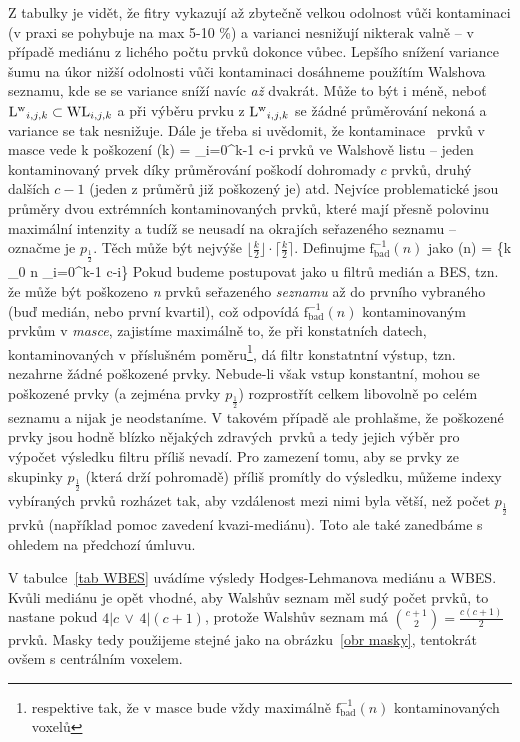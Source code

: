     Z tabulky je vidět, že fitry vykazují až zbytečně velkou odolnost vůči kontaminaci (v praxi se pohybuje na max 5-10 \%) a varianci nesnižují nikterak valně -- v případě mediánu z lichého počtu prvků dokonce vůbec. Lepšího snížení variance šumu na úkor nižší odolnosti vůči kontaminaci dosáhneme použítím Walshova seznamu, kde se se variance sníží navíc \emph{až} dvakrát. Může to být i méně, neboť ${\mathrm{L^w}_{i,j,k}} \subset {\mathrm{WL}_{i,j,k}}$ a při výběru prvku z ${\mathrm{L^w}_{i,j,k}}$ se žádné průměrování nekoná a variance se tak nesnižuje. Dále je třeba si uvědomit, že kontaminace \kk~prvků v masce vede k poškození 
    \beq
    (k) = \sum_{i=0}^{k-1} c-i 
    \eeq
    prvků ve Walshově listu -- jeden kontaminovaný prvek díky průměrování poškodí dohromady $c$ prvků, druhý dalších $c-1$ (jeden z průměrů již poškozený je) atd. Nejvíce problematické jsou průměry dvou extrémních kontaminovaných prvků, které mají přesně polovinu maximální intenzity a tudíž se neusadí na okrajích seřazeného seznamu -- označme je $p_{\frac{1}{2}}$. Těch může být nejvýše $\lfloor\frac{k}{2}\rfloor\cdot\lceil\frac{k}{2}\rceil$. Definujme $\mathrm{f_{bad}^{-1}}(n)$ jako
    \beq
    (n) = \max\bigg\{k \in \Nn_0 \;\bigg\vert\; n \geq \sum_{i=0}^{k-1} c-i\bigg\}
    \eeq
    Pokud budeme postupovat jako u filtrů medián a BES, tzn. že může být poškozeno \textit{n} prvků seřazeného \emph{seznamu} až do prvního vybraného (buď medián, nebo první kvartil), což odpovídá $\mathrm{f_{bad}^{-1}}(n)$ kontaminovaným prvkům v \emph{masce}, zajistíme maximálně to, že při konstatních datech, kontaminovaných v příslušném poměru\footnote{respektive tak, že v masce bude vždy maximálně $\mathrm{f_{bad}^{-1}}(n)$ kontaminovaných voxelů}, dá filtr konstatntní výstup, tzn. nezahrne žádné poškozené prvky. Nebude-li však vstup konstantní, mohou se poškozené prvky (a zejména prvky $p_{\frac{1}{2}}$) rozprostřít celkem libovolně po celém seznamu a nijak je neodstaníme. V takovém případě ale prohlašme, že poškozené prvky jsou hodně blízko nějakých \bq zdravých\eq ~prvků a tedy jejich výběr pro výpočet výsledku filtru příliš nevadí. Pro zamezení tomu, aby se prvky ze skupinky $p_{\frac{1}{2}}$ (která drží pohromadě) příliš promítly do výsledku, můžeme indexy vybíraných prvků rozházet tak, aby vzdálenost mezi nimi byla větší, než počet $p_{\frac{1}{2}}$ prvků (například pomoc zavedení kvazi-mediánu). Toto ale také zanedbáme s ohledem na předchozí úmluvu.
    
    V tabulce~\ref{tab WBES} uvádíme výsledy Hodges-Lehmanova mediánu a WBES. Kvůli mediánu je opět vhodné, aby Walshův seznam měl sudý počet prvků, to nastane pokud $4|c \,\vee\, 4|(c+1)$, protože Walshův seznam má ${c+1 \choose 2} = \frac{c(c+1)}{2}$ prvků. Masky tedy použijeme stejné jako na obrázku~\ref{obr masky}, tentokrát ovšem s centrálním voxelem.

